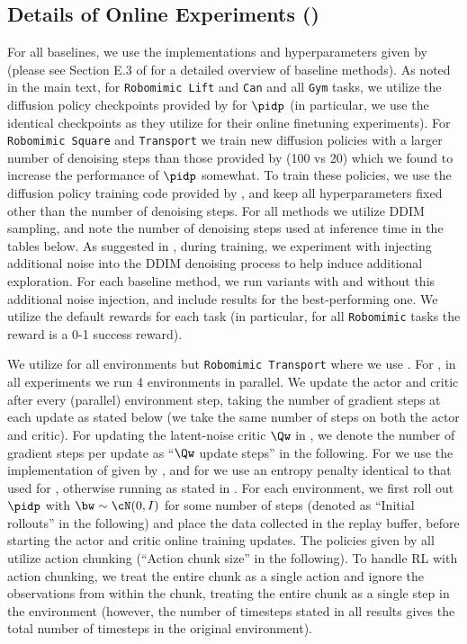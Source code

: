 \subsection{Details of Online Experiments ()}\label{sec:online_exp_details}

For all baselines, we use the implementations and hyperparameters given by \citet{ren2024diffusion} (please see Section E.3 of \cite{ren2024diffusion} for a detailed overview of baseline methods). As noted in the main text, for \texttt{Robomimic Lift} and \texttt{Can} and all \texttt{Gym} tasks, we utilize the diffusion policy checkpoints provided by \citet{ren2024diffusion} for $\pidp$ (in particular, we use the identical checkpoints as they utilize for their online finetuning experiments). For \texttt{Robomimic Square} and \texttt{Transport} we train new diffusion policies with a larger number of denoising steps than those provided by \citet{ren2024diffusion} (100 vs 20) which we found to increase the performance of $\pidp$ somewhat. To train these policies, we use the diffusion policy training code provided by \citet{ren2024diffusion}, and keep all hyperparameters fixed other than the number of denoising steps.
For all methods we utilize DDIM sampling, and note the number of denoising steps used at inference time in the tables below. As suggested in \citet{ren2024diffusion}, during training, we experiment with injecting additional noise into the DDIM denoising process to help induce additional exploration. For each baseline method, we run variants with and without this additional noise injection, and include results for the best-performing one. 
We utilize the default rewards for each task (in particular, for all \texttt{Robomimic} tasks the reward is a 0-1 success reward).

We utilize \algnamena for all environments but \texttt{Robomimic Transport} where we use \algnamesac. For \algname, in all experiments we run 4 environments in parallel. We update the actor and critic after every (parallel) environment step, taking the number of gradient steps at each update as stated below (we take the same number of steps on both the actor and critic). For updating the latent-noise critic $\Qw$ in \algnamena, we denote the number of gradient steps per update as ``$\Qw$ update steps'' in the following. For \algnamesac we use the implementation of \sac given by \cite{raffin2021stable}, and for \algnamena we use an entropy penalty identical to that used for \sac, otherwise running \algnamena as stated in . For each environment, we first roll out $\pidp$ with $\bw \sim \cN(0,I)$ for some number of steps (denoted as ``Initial rollouts'' in the following) and place the data collected in the replay buffer, before starting the actor and critic online training updates. The policies given by \citet{ren2024diffusion} all utilize action chunking (``Action chunk size'' in the following). To handle RL with action chunking, we treat the entire chunk as a single action and ignore the observations from within the chunk, treating the entire chunk as a single step in the environment (however, the number of timesteps stated in all results gives the total number of timesteps in the original environment).

